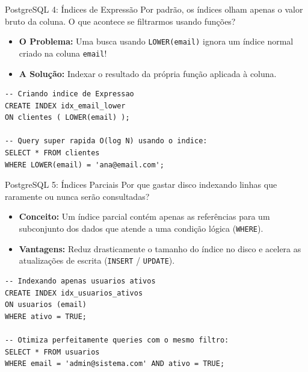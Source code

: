 \documentclass[9pt]{beamer}
\begin{document}
\begin{frame}[fragile]{PostgreSQL 4: Índices de Expressão}
    Por padrão, os índices olham apenas o valor bruto da coluna. O que acontece se filtrarmos usando funções?
    
    \vspace{0.2cm}
    \begin{itemize}
        \item \textbf{O Problema:} Uma busca usando \texttt{LOWER(email)} ignora um índice normal criado na coluna \texttt{email}!
        \item \textbf{A Solução:} Indexar o resultado da própria função aplicada à coluna.
    \end{itemize}
    
    \vspace{0.2cm}
    \begin{lstlisting}[basicstyle=\ttfamily\scriptsize]
-- Criando indice de Expressao
CREATE INDEX idx_email_lower 
ON clientes ( LOWER(email) );

-- Query super rapida O(log N) usando o indice:
SELECT * FROM clientes 
WHERE LOWER(email) = 'ana@email.com';
    \end{lstlisting}
\end{frame}

\begin{frame}[fragile]{PostgreSQL 5: Índices Parciais}
    Por que gastar disco indexando linhas que raramente ou nunca serão consultadas?
    
    \vspace{0.2cm}
    \begin{itemize}
        \item \textbf{Conceito:} Um índice parcial contém apenas as referências para um subconjunto dos dados que atende a uma condição lógica (\texttt{WHERE}).
        \item \textbf{Vantagens:} Reduz drasticamente o tamanho do índice no disco e acelera as atualizações de escrita (\texttt{INSERT} / \texttt{UPDATE}).
    \end{itemize}
    
    \vspace{0.2cm}
    \begin{lstlisting}[basicstyle=\ttfamily\scriptsize]
-- Indexando apenas usuarios ativos
CREATE INDEX idx_usuarios_ativos 
ON usuarios (email) 
WHERE ativo = TRUE;

-- Otimiza perfeitamente queries com o mesmo filtro:
SELECT * FROM usuarios 
WHERE email = 'admin@sistema.com' AND ativo = TRUE;
    \end{lstlisting}
\end{frame}
\end{document}
